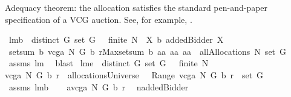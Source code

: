 \begin{isabellebody}
%
\endisadelimproof
%
\begin{isamarkuptext}%
Adequacy theorem: the allocation satisfies the standard pen-and-paper specification of a VCG auction.
See, for example, \cite[\S~1.2]{cramton}.%
\end{isamarkuptext}%
\isamarkuptrue%
\isamarkupfalse%
\ lm{}{}b{\isacharcolon}\ \ {\isachardoublequoteopen}distinct\ G{\isachardoublequoteclose}\ {\isachardoublequoteopen}set\ G\ {\isasymnoteq}\ {\isacharbraceleft}{\isacharbraceright}{\isachardoublequoteclose}\ {\isachardoublequoteopen}finite\ N{\isachardoublequoteclose}\ {\isachardoublequoteopen}{\isasymforall}\ X{\isachardot}\ b\ {\isacharparenleft}addedBidder{\isacharprime}{\isacharcomma}\ X{\isacharparenright}{\isacharequal}{}{\isachardoublequoteclose}\ \isanewline
{}\ {\isachardoublequoteopen}setsum\ b\ {\isacharparenleft}vcga{\isacharprime}\ N\ G\ b\ r{\isacharparenright}{\isacharequal}Max{\isacharbraceleft}setsum\ b\ aa{\isacharbar}\ aa{\isachardot}\ aa\ {\isasymin}\ allAllocations{\isacharprime}\ N\ {\isacharparenleft}set\ G{\isacharparenright}{\isacharbraceright}{\isachardoublequoteclose}\isanewline
%
\isadelimproof
%
\endisadelimproof
%
\isatagproof
{}\isamarkupfalse%
\ assms\ lm{}{}\ \isamarkupfalse%
\ blast%
\endisatagproof
{\isafoldproof}%
%
\isadelimproof
\isanewline
%
\endisadelimproof
\isanewline
{}\isamarkupfalse%
\ lm{}{}e{\isacharcolon}\ \ {\isachardoublequoteopen}distinct\ G{\isachardoublequoteclose}\ {\isachardoublequoteopen}set\ G\ {\isasymnoteq}\ {\isacharbraceleft}{\isacharbraceright}{\isachardoublequoteclose}\ {\isachardoublequoteopen}finite\ N{\isachardoublequoteclose}\ \isanewline
{\isachardoublequoteopen}vcga{\isacharprime}\ N\ G\ b\ r\ {\isasymin}\ allocationsUniverse\ {\isacharampersand}\ {\isasymUnion}\ Range\ {\isacharparenleft}vcga{\isacharprime}\ N\ G\ b\ r{\isacharparenright}\ {\isasymsubseteq}\ set\ G{\isachardoublequoteclose}%
\isadelimproof
\ %
\endisadelimproof
%
\isatagproof
{}\isamarkupfalse%
\ assms\ lm{}{}b\ \isanewline
{}\isamarkupfalse%
\ {\isacharminus}\isanewline
{}\isamarkupfalse%
\ {\isacharquery}a{\isacharequal}{\isachardoublequoteopen}vcga{\isacharprime}\ N\ G\ b\ r{\isachardoublequoteclose}\ \isamarkupfalse%
\ {\isacharquery}n{\isacharequal}addedBidder{\isacharprime}\isanewline
{}\isamarkupfalse%

\end{isabellebody}
